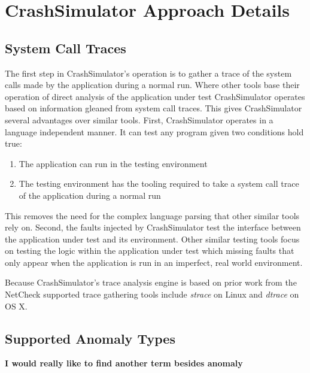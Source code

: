 \section{CrashSimulator Approach Details}

    \subsection{System Call Traces}

        The first step in CrashSimulator's operation is to gather a trace of the system calls made by the application
        during a normal run. Where other tools base their operation of direct analysis of the application under test
        CrashSimulator operates based on information gleaned from system call traces. This gives CrashSimulator several
        advantages over similar tools. First, CrashSimulator operates in a language independent manner. It can test any
        program given two conditions hold true:

        \begin{enumerate}
            \item{The application can run in the testing environment}
            \item{The testing environment has the tooling required to take a system call trace of the application during
            a normal run}
        \end{enumerate}

        This removes the need for the complex language parsing that other similar tools rely on. Second, the faults
        injected by CrashSimulator test the interface between the application under test and its environment. Other
        similar testing tools focus on testing the logic within the application under test which missing faults that
        only appear when the application is run in an imperfect, real world environment.

        Because CrashSimulator's trace analysis engine is based on prior work from the NetCheck supported trace
        gathering tools include \emph{strace} on Linux and \emph{dtrace} on OS X.


    \subsection{Supported Anomaly Types}

        \textbf{I would really like to find another term besides anomaly}

